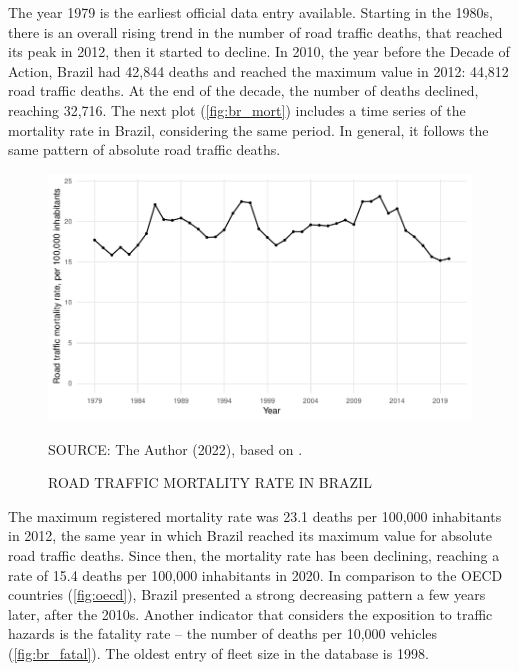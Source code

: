 The year 1979 is the earliest official data entry available. Starting in the 1980s, there is an overall rising trend in the number of road traffic deaths, that reached its peak in 2012, then it started to decline. In 2010, the year before the Decade of Action, Brazil had 42,844 deaths and reached the maximum value in 2012: 44,812 road traffic deaths. At the end of the decade, the number of deaths declined, reaching 32,716. The next plot (\autoref{fig:br_mort}) includes a time series of the mortality rate in Brazil, considering the same period. In general, it follows the same pattern of absolute road traffic deaths.

\begin{figure}[!htbp]
    \centering\footnotesize
    \captionsetup{font=footnotesize}
    \caption{ROAD TRAFFIC MORTALITY RATE IN BRAZIL}
    \includegraphics{fig/brazil_mort.pdf}
    \label{fig:br_mort}
    \par SOURCE: The Author (2022), based on \textcite{MinistryofHealth2022, MinistryofHealth2021}. 
\end{figure}

The maximum registered mortality rate was 23.1 deaths per 100,000 inhabitants in 2012, the same year in which Brazil reached its maximum value for absolute road traffic deaths. Since then, the mortality rate has been declining, reaching a rate of 15.4 deaths per 100,000 inhabitants in 2020. In comparison to the OECD countries (\autoref{fig:oecd}), Brazil presented a strong decreasing pattern a few years later, after the 2010s. Another indicator that considers the exposition to traffic hazards is the fatality rate – the number of deaths per 10,000 vehicles (\autoref{fig:br_fatal}). The oldest entry of fleet size in the \textcite{DENATRAN2020} database is 1998.

